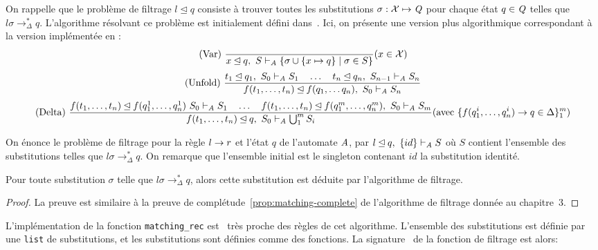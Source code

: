 On rappelle que le problème de filtrage $l \unlhd q$ consiste à trouver toutes les substitutions
$\sigma:\mathcal X \mapsto \mathit Q$ pour chaque état $q \in \mathit Q$ telles que 
$l\sigma \rightarrow_\Delta^* q$. L'algorithme résolvant ce problème est initialement 
défini dans~\cite{Genet-RR97b}. Ici, on présente une version plus algorithmique correspondant 
à la version implémentée en \coq:
{\footnotesize
  \[\textrm{(Var) }
  \dfrac{}{x \unlhd q,\ S \vdash_\mathit A \{\sigma \cup \{x \mapsto q\} \; | \; \sigma \in S \}}
  (x \in \mathcal X)
  \]
  \[\textrm{(Unfold) }
  \dfrac{
    t_1 \unlhd q_1, \ S_0 \vdash_\mathit A S_1
    \quad \dots \quad
    t_n \unlhd q_n, \ S_{n-1} \vdash_\mathit A S_n
  }{f(t_1, \dots, t_n) \unlhd f(q_1, \dots q_n),\ S_0 \vdash_\mathit A S_n}
  \]
  \[
  \textrm{(Delta) }
   \dfrac{
     f(t_1, \dots, t_n) \unlhd f(q_1^1, \dots, q_n^1)\ S_0 \vdash_\mathit A S_1
     \quad \dots \quad
     f(t_1 ,\dots, t_n) \unlhd f(q_1^m, \dots, q_n^m),\ S_0 \vdash_\mathit A S_m
   }{
     f(t_1, \dots, t_n) \unlhd q,\ S_0 \vdash_\mathit A \bigcup_1^m S_i
   }
   (
   \textrm{avec } \{ f(q_1^i, \dots, q_n^i) \rightarrow q \in \Delta\} _1^m 
   )
   \]
 }

On énonce le problème de filtrage pour la règle $l \rightarrow r$ et l'état $q$ de l'automate $\mathit A$,
par $l\unlhd q,\ \{id\} \vdash_\mathit A S$ où $S$ contient l'ensemble des substitutions telles que
$l\sigma \rightarrow_\Delta^* q$. On remarque que l'ensemble initial est le singleton contenant $id$
la substitution identité.

\begin{theorem}
  \label{th:completeness}
  Pour toute substitution $\sigma$ telle que $l\sigma \rightarrow_\Delta^* q$, alors 
  cette substitution est déduite par l'algorithme de filtrage.
\end{theorem}

\begin{proof}
  La preuve est similaire à la preuve de complétude~\ref{prop:matching-complete} de l'algorithme de filtrage
  donnée au chapitre~3.
\end{proof}

L'implémentation de la fonction \lstinline!matching_rec! est \coq\ très proche
des règles de cet algorithme. L'ensemble des substitutions est définie par une 
\lstinline!list! de substitutions, et les substitutions sont définies comme des fonctions.
La signature \coq\ de la fonction de filtrage est alors:


